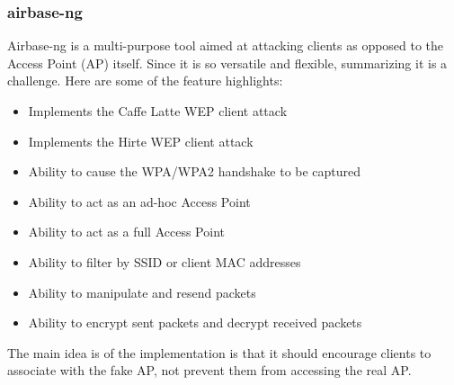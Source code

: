 \documentclass{article}
\begin{document}
\subsubsection{airbase-ng}
Airbase-ng is a multi-purpose tool aimed at attacking clients as opposed to the Access Point (AP) itself. Since it is so versatile and flexible, summarizing it is a challenge. Here are some of the feature highlights:
\begin{itemize}
	\item Implements the Caffe Latte WEP client attack
	\item Implements the Hirte WEP client attack
	\item Ability to cause the WPA/WPA2 handshake to be captured
	\item Ability to act as an ad-hoc Access Point
	\item Ability to act as a full Access Point
	\item Ability to filter by SSID or client MAC addresses
	\item Ability to manipulate and resend packets
	\item Ability to encrypt sent packets and decrypt received packets
\end{itemize}
The main idea is of the implementation is that it should encourage clients to  associate  with  the fake AP, not prevent them from accessing the real AP.
\end{document}
